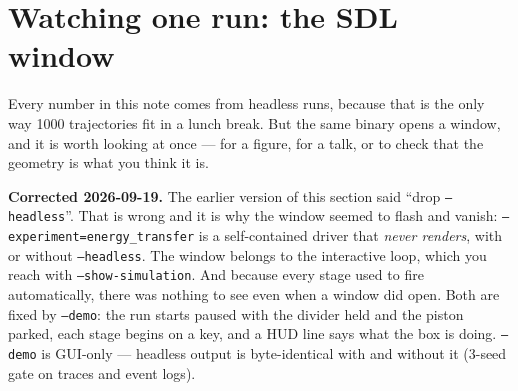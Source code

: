 \documentclass[11pt,a4paper]{article}
\newcommand{\cmd}[1]{\texttt{\footnotesize #1}}
\begin{document}
\section{Watching one run: the SDL window}

Every number in this note comes from headless runs, because that is the only way 1000 trajectories fit in a lunch
break. But the same binary opens a window, and it is worth looking at once --- for a figure, for a talk, or to check
that the geometry is what you think it is.

\textbf{Corrected 2026-09-19.} The earlier version of this section said ``drop \cmd{--headless}''. That is wrong and it
is why the window seemed to flash and vanish: \cmd{--experiment=energy\_transfer} is a self-contained driver that
\emph{never renders}, with or without \cmd{--headless}. The window belongs to the interactive loop, which you reach
with \cmd{--show-simulation}. And because every stage used to fire automatically, there was nothing to see even when a
window did open. Both are fixed by \cmd{--demo}: the run starts paused with the divider held and the piston parked, each
stage begins on a key, and a HUD line says what the box is doing. \cmd{--demo} is GUI-only --- headless output is
byte-identical with and without it (3-seed gate on traces and event logs).
\end{document}

